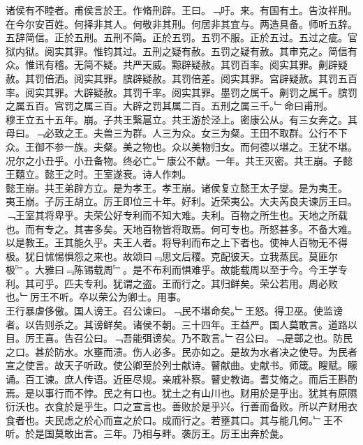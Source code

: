 \documentclass{zhvt-classic}
\begin{document}
\hspace*{2em}诸侯有不睦者。甫侯言於王。作脩刑辟。王曰。﹁吁。来。有国有土。告汝祥刑。在今尔安百姓。何择非其人。何敬非其刑。何居非其宜与。两造具备。师听五辞。五辞简信。正於五刑。五刑不简。正於五罚。五罚不服。正於五过。五过之疵。官狱内狱。阅实其罪。惟钧其过。五刑之疑有赦。五罚之疑有赦。其审克之。简信有众。惟讯有稽。无简不疑。共严天威。黥辟疑赦。其罚百率。阅实其罪。劓辟疑赦。其罚倍洒。阅实其罪。膑辟疑赦。其罚倍差。阅实其罪。宫辟疑赦。其罚五百率。阅实其罪。大辟疑赦。其罚千率。阅实其罪。墨罚之属千。劓罚之属千。膑罚之属五百。宫罚之属三百。大辟之罚其属二百。五刑之属三千。﹂命曰甫刑。\\
\hspace*{2em}穆王立五十五年。崩。子共王繄扈立。共王游於泾上。密康公从。有三女奔之。其母曰。﹁必致之王。夫兽三为群。人三为众。女三为粲。王田不取群。公行不下众。王御不参一族。夫粲。美之物也。众以美物归女。而何德以堪之。王犹不堪。况尔之小丑乎。小丑备物。终必亡。﹂康公不献。一年。共王灭密。共王崩。子懿王囏立。懿王之时。王室遂衰。诗人作刺。\\
\hspace*{2em}懿王崩。共王弟辟方立。是为孝王。孝王崩。诸侯复立懿王太子燮。是为夷王。\\
\hspace*{2em}夷王崩。子厉王胡立。厉王即位三十年。好利。近荣夷公。大夫芮良夫谏厉王曰。﹁王室其将卑乎。夫荣公好专利而不知大难。夫利。百物之所生也。天地之所载也。而有专之。其害多矣。天地百物皆将取焉。何可专也。所怒甚多。不备大难。以是教王。王其能久乎。夫王人者。将导利而布之上下者也。使神人百物无不得极。犹日怵惕惧怨之来也。故颂曰﹃思文后稷。克配彼天。立我蒸民。莫匪尔极﹄。大雅曰﹃陈锡载周﹄。是不布利而惧难乎。故能载周以至于今。今王学专利。其可乎。匹夫专利。犹谓之盗。王而行之。其归鲜矣。荣公若用。周必败也。﹂厉王不听。卒以荣公为卿士。用事。\\
\hspace*{2em}王行暴虐侈傲。国人谤王。召公谏曰。﹁民不堪命矣。﹂王怒。得卫巫。使监谤者。以告则杀之。其谤鲜矣。诸侯不朝。三十四年。王益严。国人莫敢言。道路以目。厉王喜。告召公曰。﹁吾能弭谤矣。乃不敢言。﹂召公曰。﹁是鄣之也。防民之口。甚於防水。水壅而溃。伤人必多。民亦如之。是故为水者决之使导。为民者宣之使言。故天子听政。使公卿至於列士献诗。瞽献曲。史献书。师箴。瞍赋。矇诵。百工谏。庶人传语。近臣尽规。亲戚补察。瞽史教诲。耆艾脩之。而后王斟酌焉。是以事行而不悖。民之有口也。犹土之有山川也。财用於是乎出。犹其有原隰衍沃也。衣食於是乎生。口之宣言也。善败於是乎兴。行善而备败。所以产财用衣食者也。夫民虑之於心而宣之於口。成而行之。若壅其口。其与能几何。﹂王不听。於是国莫敢出言。三年。乃相与畔。袭厉王。厉王出奔於彘。\\
\end{document}

